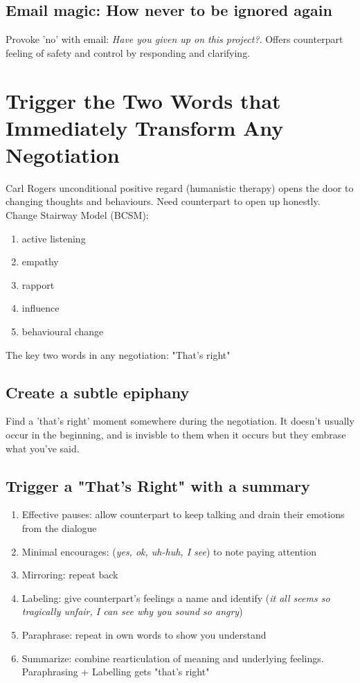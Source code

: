 \documentclass{summary}
\begin{document}
\subsection{Email magic: How never to be ignored again}
Provoke 'no' with email: \textit{Have you given up on this project?}. Offers counterpart feeling of safety and control by responding and clarifying.

\section{Trigger the Two Words that Immediately Transform Any Negotiation}
Carl Rogers unconditional positive regard (humanistic therapy) opens the door to changing thoughts and behaviours. Need counterpart to open up honestly. Change Stairway Model (BCSM):
\begin{enumerate}
  \item active listening
  \item empathy
  \item rapport
  \item influence
  \item behavioural change
\end{enumerate}
The key two words in any negotiation: "That's right"
\subsection{Create a subtle epiphany}
Find a 'that's right' moment somewhere during the negotiation. It doesn't usually occur in the beginning, and is invisble to them when it occurs but they embrase what you've said.
\subsection{Trigger a "That's Right" with a summary}
\begin{enumerate}
  \item Effective pauses: allow counterpart to keep talking and drain their emotions from the dialogue
  \item Minimal encourages: (\textit{yes, ok, uh-huh, I see}) to note paying attention
  \item Mirroring: repeat back
  \item Labeling: give counterpart's feelings a name and identify (\textit{it all seems so tragically unfair, I can see why you sound so angry})
  \item Paraphrase: repeat in own words to show you understand
  \item Summarize: combine rearticulation of meaning and underlying feelings. Paraphrasing + Labelling gets "that's right"
\end{enumerate}
\end{document}
